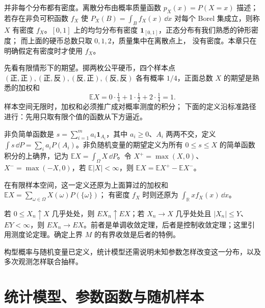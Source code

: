 并非每个分布都有密度。离散分布由概率质量函数
\(p_X(x)=P(X=x)\) 描述；若存在非负可积函数 \(f_X\) 使
\(P_X(B)=\int_Bf_X(x)\,\dd x\) 对每个 Borel 集成立，则称
\(X\) 有密度 \(f_X\)。\([0,1]\) 上的均匀分布有密度
\(\mathbf1_{[0,1]}\)，正态分布有我们熟悉的钟形密度；
而上面的硬币总数只取 \(0,1,2\)，质量集中在离散点上，
没有密度。本章只在明确假定有密度时才使用 \(f_X\)。

先看有限情形下的期望。掷两枚公平硬币，四个样本点
\((\text{正},\text{正}),(\text{正},\text{反}),
(\text{反},\text{正}),(\text{反},\text{反})\)
各有概率 \(1/4\)，正面总数 \(X\) 的期望是熟悉的加权和
\[
\mathbb EX=0\cdot\tfrac14+1\cdot\tfrac12+2\cdot\tfrac14=1.
\]
样本空间无限时，加权和必须推广成对概率测度的积分；
下面的定义沿标准路径进行：先用只取有限个值的函数从下方逼近。

\begin{definition}[期望]
非负简单函数是 \(s=\sum_{i=1}^m a_i\mathbf1_{A_i}\)，其中 \(a_i\ge0\)、\(A_i\) 两两不交，定义 \(\int s\,\dd P=\sum_i a_iP(A_i)\)。非负随机变量的期望定义为所有 \(0\le s\le X\) 的简单函数积分的上确界，记为 \(\mathbb E X=\int_\Omega X\,\dd P\)。令 \(X^+=\max(X,0)\)、\(X^-=\max(-X,0)\)，若 \(\mathbb E|X|<\infty\)，则 \(\mathbb E X=\mathbb E X^+-\mathbb E X^-\)。
\end{definition}

在有限样本空间，这一定义还原为上面算过的加权和
\(\mathbb E X=\sum_{\omega\in\Omega}X(\omega)P(\{\omega\})\)；
有密度 \(f_X\) 时则还原为 \(\int_{\mathbb R}xf_X(x)\,\dd x\)。


\begin{theorem}[用于期望的两种极限交换]
若 $0\le X_n\uparrow X$ 几乎处处，则 $EX_n\uparrow EX$；若 $X_n\to X$ 几乎处处且 $|X_n|\le Y$、$EY<\infty$，则 $EX_n\to EX$。前者是单调收敛定理，后者是控制收敛定理；这里引用测度论定理。确定上界 $M$ 的有界收敛是后者的特例。
\end{theorem}
构型概率与随机变量已定义，统计模型还需说明未知参数怎样改变这一分布，以及多次观测怎样联合抽样。

\section{统计模型、参数函数与随机样本}




